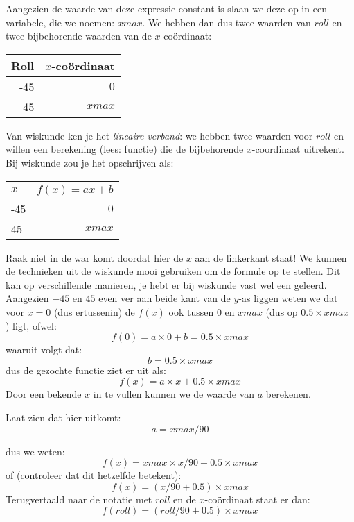 Aangezien de waarde van deze expressie constant is slaan we deze op in een variabele, die we noemen: $xmax$. We hebben dan dus twee waarden van $roll$ en twee bijbehorende waarden van de $x$-co\"ordinaat:
\begin{center}
  \begin{tabular}{ r | r }
    \hline
	Roll	&	$x$-co\"ordinaat  \\
	\hline 
	-45	&	$0$             \\
	45	&	$xmax$          \\
    \hline
  \end{tabular}
\end{center}


Van wiskunde ken je het \emph{lineaire verband}: we hebben twee waarden voor $roll$ en willen een berekening (lees: functie) die de bijbehorende $x$-coordinaat uitrekent. Bij wiskunde zou je het opschrijven als: 

\begin{center}
  \begin{tabular}{ l | r }
    \hline
	$x$	&	 $ f(x) = ax + b $  \\
	\hline
	-45	&	$0$               \\

	45	& 	$xmax$            \\
    \hline
  \end{tabular}
\end{center}



Raak niet in de war komt doordat hier de $x$ aan de linkerkant staat! We kunnen de technieken uit de wiskunde mooi gebruiken om de formule op te stellen. Dit kan op verschillende manieren, je hebt er bij wiskunde vast wel een geleerd. Aangezien $-45$ en $45$ even ver aan beide kant van de $y$-as liggen weten we dat voor $x=0$ (dus ertussenin) de $f(x)$ ook tussen $0$ en $xmax$ (dus op $ 0.5 \times xmax $ ) ligt, ofwel: 
\[
	f(0) = a \times 0 + b = 0.5 \times  xmax 
\]
waaruit volgt dat:
\[
	b = 0.5 \times xmax
\]
dus de gezochte functie ziet er uit als:
\[
	f(x) = a \times x + 0.5 \times xmax
\]
Door een bekende $x$ in te vullen kunnen we de waarde van $a$ berekenen. 

\begin{opgave}
   \opgVraag
	Laat zien dat hier uitkomt:
\[
	a=xmax/90
\]
\end{opgave}
dus we weten:
\[
	f(x) = xmax \times x/90 + 0.5 \times xmax
\]
of (controleer dat dit hetzelfde betekent):
\[
	f(x) = (x/90 + 0.5)  \times  xmax
\]
Terugvertaald naar de notatie met $roll$ en de $x$-co\"ordinaat staat er dan:
\[
	f(roll) = (roll/90 + 0.5)  \times  xmax
\]

